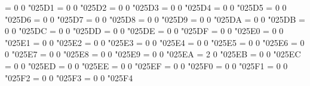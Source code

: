 \Umathchardef\circlerighthalfblack = 0 0 "025D1 %
\Umathchardef\circlebottomhalfblack = 0 0 "025D2 %
\Umathchardef\circletophalfblack = 0 0 "025D3 %
\Umathchardef\circleurquadblack = 0 0 "025D4 %
\Umathchardef\blackcircleulquadwhite = 0 0 "025D5 %
\Umathchardef\blacklefthalfcircle = 0 0 "025D6 %
\Umathchardef\blackrighthalfcircle = 0 0 "025D7 %
\Umathchardef\inversebullet = 0 0 "025D8 %
\Umathchardef\inversewhitecircle = 0 0 "025D9 %
\Umathchardef\invwhiteupperhalfcircle = 0 0 "025DA %
\Umathchardef\invwhitelowerhalfcircle = 0 0 "025DB %
\Umathchardef\ularc = 0 0 "025DC %
\Umathchardef\urarc = 0 0 "025DD %
\Umathchardef\lrarc = 0 0 "025DE %
\Umathchardef\llarc = 0 0 "025DF %
\Umathchardef\topsemicircle = 0 0 "025E0 %
\Umathchardef\botsemicircle = 0 0 "025E1 %
\Umathchardef\lrblacktriangle = 0 0 "025E2 %
\Umathchardef\llblacktriangle = 0 0 "025E3 %
\Umathchardef\ulblacktriangle = 0 0 "025E4 %
\Umathchardef\urblacktriangle = 0 0 "025E5 %
\Umathchardef\smwhtcircle = 0 0 "025E6 %
\Umathchardef\squareleftblack = 0 0 "025E7 %
\Umathchardef\squarerightblack = 0 0 "025E8 %
\Umathchardef\squareulblack = 0 0 "025E9 %
\Umathchardef\squarelrblack = 0 0 "025EA %
\Umathchardef\boxbar = 2 0 "025EB %
\Umathchardef\trianglecdot = 0 0 "025EC %
\Umathchardef\triangleleftblack = 0 0 "025ED %
\Umathchardef\trianglerightblack = 0 0 "025EE %
\Umathchardef\lgwhtcircle = 0 0 "025EF %
\Umathchardef\squareulquad = 0 0 "025F0 %
\Umathchardef\squarellquad = 0 0 "025F1 %
\Umathchardef\squarelrquad = 0 0 "025F2 %
\Umathchardef\squareurquad = 0 0 "025F3 %
\Umathchardef\circleulquad = 0 0 "025F4 %
